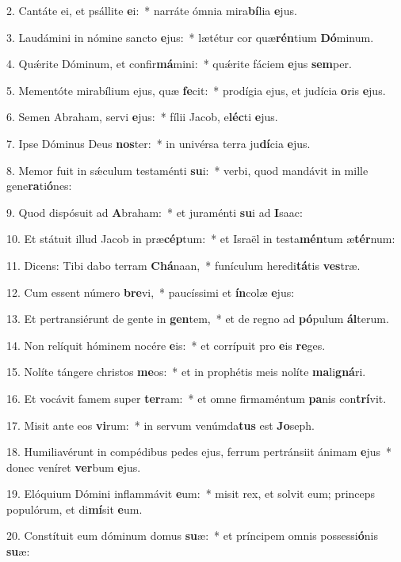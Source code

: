 2. Cantáte ei, et psállite \textbf{e}i:~*  narráte ómnia mira\textbf{bí}lia \textbf{e}jus.\

3. Laudámini in nómine sancto \textbf{e}jus:~*  lætétur cor quæ\textbf{rén}tium \textbf{Dó}minum.\

4. Quǽrite Dóminum, et confir\textbf{má}mini:~*  quǽrite fáciem \textbf{e}jus \textbf{sem}per.\

5. Mementóte mirabílium ejus, quæ \textbf{fe}cit:~*  prodígia ejus, et judícia \textbf{o}ris \textbf{e}jus.\

6. Semen Abraham, servi \textbf{e}jus:~*  fílii Jacob, e\textbf{léc}ti \textbf{e}jus.\

7. Ipse Dóminus Deus \textbf{nos}ter:~*  in univérsa terra ju\textbf{dí}cia \textbf{e}jus.\

8. Memor fuit in sǽculum testaménti \textbf{su}i:~*  verbi, quod mandávit in mille gene\textbf{ra}ti\textbf{ó}nes:\

9. Quod dispósuit ad \textbf{A}braham:~*  et juraménti \textbf{su}i ad \textbf{I}saac:\

10. Et státuit illud Jacob in præ\textbf{cép}tum:~*  et Israël in testa\textbf{mén}tum æ\textbf{tér}num:\

11. Dicens: Tibi dabo terram \textbf{Chá}naan,~*  funículum heredi\textbf{tá}tis \textbf{ves}træ.\

12. Cum essent número \textbf{bre}vi,~*  paucíssimi et \textbf{ín}colæ \textbf{e}jus:\

13. Et pertransiérunt de gente in \textbf{gen}tem,~*  et de regno ad \textbf{pó}pulum \textbf{ál}terum.\

14. Non relíquit hóminem nocére \textbf{e}is:~*  et corrípuit pro \textbf{e}is \textbf{re}ges.\

15. Nolíte tángere christos \textbf{me}os:~*  et in prophétis meis nolíte \textbf{ma}li\textbf{gná}ri.\

16. Et vocávit famem super \textbf{ter}ram:~*  et omne firmaméntum \textbf{pa}nis con\textbf{trí}vit.\

17. Misit ante eos \textbf{vi}rum:~*  in servum venúmda\textbf{tus} est \textbf{Jo}seph.\

18. Humiliavérunt in compédibus pedes ejus, ferrum pertránsiit ánimam \textbf{e}jus~*  donec veníret \textbf{ver}bum \textbf{e}jus.\

19. Elóquium Dómini inflammávit \textbf{e}um:~*  misit rex, et solvit eum; princeps populórum, et di\textbf{mí}sit \textbf{e}um.\

20. Constítuit eum dóminum domus \textbf{su}æ:~*  et príncipem omnis possessi\textbf{ó}nis \textbf{su}æ:\

